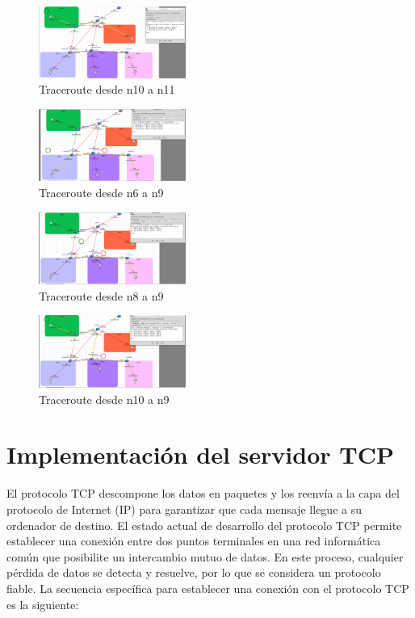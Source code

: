 \documentclass[letterpaper, 10 pt, conference]{ieeeconf}  %
\begin{document}
\begin{figure}[H]
	\centering
	\includegraphics[width=0.43\textwidth]{./Imagenes/traceroute_1.png}
	\caption{Traceroute desde n10 a n11}
\end{figure}
\begin{figure}[H]
	\centering
	\includegraphics[width=0.43\textwidth]{./Imagenes/traceroute_2.png}
	\caption{Traceroute desde n6 a n9}
\end{figure}
\begin{figure}[H]
	\centering
	\includegraphics[width=0.43\textwidth]{./Imagenes/traceroute_3.png}
	\caption{Traceroute desde n8 a n9}
\end{figure}
\begin{figure}[H]
	\centering
	\includegraphics[width=0.43\textwidth]{./Imagenes/traceroute_4.png}
	\caption{Traceroute desde n10 a n9}
\end{figure}


\section{Implementación del servidor TCP}

El protocolo TCP descompone los datos en paquetes y los reenvía a la capa del protocolo de Internet (IP) para garantizar que cada mensaje llegue a su ordenador de destino. El estado actual de desarrollo del protocolo TCP permite establecer una conexión entre dos puntos terminales en una red informática común que posibilite un intercambio mutuo de datos. En este proceso, cualquier pérdida de datos se detecta y resuelve, por lo que se considera un protocolo fiable. La secuencia específica para establecer una conexión con el protocolo TCP es la siguiente:
\end{document}
